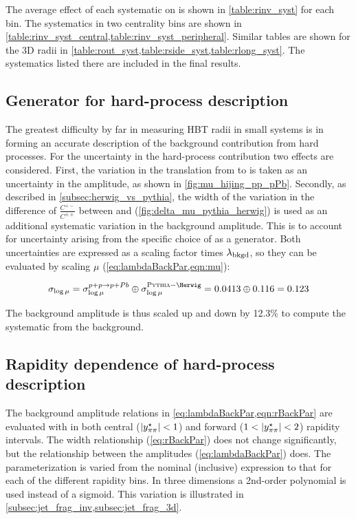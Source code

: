 The average effect of each systematic on \Rinv is shown in \cref{table:rinv_syst} for each \kt bin.
The systematics in two centrality bins are shown in \cref{table:rinv_syst_central,table:rinv_syst_peripheral}.
Similar tables are shown for the 3D radii in \cref{table:rout_syst,table:rside_syst,table:rlong_syst}.
The systematics listed there are included in the final results.

\subsection{Generator for hard-process description}
The greatest difficulty by far in measuring HBT radii in small systems is in forming an accurate description of the background contribution from hard processes.
For the uncertainty in the hard-process contribution two effects are considered.
First, the variation in the translation from \pp to \pPb is taken as an uncertainty in the amplitude, as shown in \cref{fig:mu_hijing_pp_pPb}.
Secondly, as described in \cref{subsec:herwig_vs_pythia}, the width of the variation in the difference of $\frac{C^{+-}}{C^{\pm\pm}}$ between \Pythia and \Herwig (\cref{fig:delta_mu_pythia_herwig}) is used as an additional systematic variation in the background amplitude.
This is to account for uncertainty arising from the specific choice of \Pythia as a generator.
Both uncertainties are expressed as a scaling factor times $\lambda_{\mathrm{bkgd}}$, so they can be evaluated by scaling $\mu$ (\cref{eq:lambdaBackPar,eqn:mu}):

\begin{equation}
\sigma_{\log \mu} = \sigma^{p+p \rightarrow p+Pb}_{\log \mu} \oplus \sigma^{\Pythia-\Herwig}_{\log \mu} = 0.0413 \oplus 0.116 = 0.123
\end{equation}

The background amplitude \lbkgd is thus scaled up and down by 12.3\% to compute the systematic from the background.

\subsection{Rapidity dependence of hard-process description}

The background amplitude relations in \cref{eq:lambdaBackPar,eqn:rBackPar} are evaluated with \Pythia in both central ($|y^{\star}_{\pi\pi}| < 1$) and forward ($1 < |y^{\star}_{\pi\pi}| < 2$) rapidity intervals.
The width relationship (\cref{eq:rBackPar}) does not change significantly, but the relationship between the amplitudes (\cref{eq:lambdaBackPar}) does.
The parameterization is varied from the nominal (inclusive) expression to that for each of the different rapidity bins.
In three dimensions a 2nd-order polynomial is used instead of a sigmoid.
This variation is illustrated in \cref{subsec:jet_frag_inv,subsec:jet_frag_3d}.

